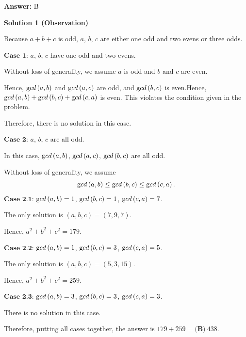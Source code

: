 \begin{enumerate}
 \textbf{Answer: }B



\textbf{Solution 1 (Observation)}

Because $a + b + c$ is odd, $a$, $b$, $c$ are either one odd and two evens or three odds.

 $\textbf{Case 1}$: $a$, $b$, $c$ have one odd and two evens.

 Without loss of generality, we assume $a$ is odd and $b$ and $c$ are even.

 Hence, ${\textrm gcd} \left( a , b \right)$ and ${\textrm gcd} \left( a , c \right)$ are odd, and ${\textrm gcd} \left( b , c \right)$ is even.Hence, ${\textrm gcd} \left( a , b \right) + {\textrm gcd} \left( b , c \right) + {\textrm gcd} \left( c , a \right)$ is even. This violates the condition given in the problem.

 Therefore, there is no solution in this case.

 $\textbf{Case 2}$: $a$, $b$, $c$ are all odd.

 In this case, ${\textrm gcd} \left( a , b \right)$, ${\textrm gcd} \left( a , c \right)$, ${\textrm gcd} \left( b , c \right)$ are all odd.

 Without loss of generality, we assume
 \[ {\textrm gcd} \left( a , b \right) \leq {\textrm gcd} \left( b , c \right) \leq {\textrm gcd} \left( c , a \right) . \]$\textbf{Case 2.1}$: ${\textrm gcd} \left( a , b \right) = 1$, ${\textrm gcd} \left( b , c \right) = 1$, ${\textrm gcd} \left( c , a \right) = 7$.

 The only solution is $(a, b, c) = (7, 9, 7)$.

 Hence, $a^2 + b^2 + c^2 = 179$.

 $\textbf{Case 2.2}$: ${\textrm gcd} \left( a , b \right) = 1$, ${\textrm gcd} \left( b , c \right) = 3$, ${\textrm gcd} \left( c , a \right) = 5$.

 The only solution is $(a, b, c) = (5, 3, 15)$.

 Hence, $a^2 + b^2 + c^2 = 259$.

 $\textbf{Case 2.3}$: ${\textrm gcd} \left( a , b \right) = 3$, ${\textrm gcd} \left( b , c \right) = 3$, ${\textrm gcd} \left( c , a \right) = 3$.

 There is no solution in this case.

 Therefore, putting all cases together, the answer is $179 + 259 = \boxed{\textbf{(B)} \: 438}$.

 




\end{enumerate}
